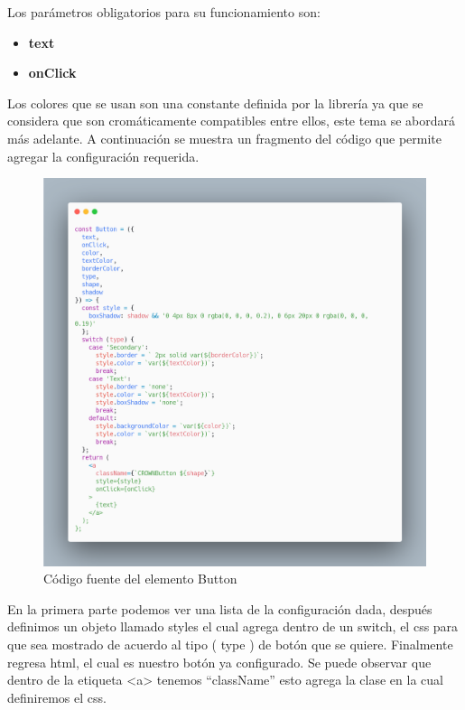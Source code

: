 Los parámetros obligatorios para su funcionamiento son:
\begin{itemize}
\item \textbf{text} 
\item \textbf{onClick} 
\end{itemize}
\newline
Los colores que se usan son una constante definida por la librería ya que se considera que son cromáticamente compatibles entre ellos, este tema se abordará más adelante.
A continuación se muestra un fragmento del código que permite agregar la configuración requerida.
\newline
\newline
\begin{figure}[H]
    \includegraphics[width=1\textwidth]{./Imagenes/carbon-9.png}
    \caption[Código fuente del elemento Button]{Código fuente del elemento Button}
    \end{figure}
\newline
\newline
En la primera parte podemos ver una lista de la configuración dada,  después definimos un objeto llamado styles el cual agrega dentro de un switch, el css para que sea mostrado de acuerdo al tipo ( type ) de botón que se quiere. Finalmente regresa html, el cual es nuestro botón ya configurado.
Se puede observar que dentro de la etiqueta <a>  tenemos “className” esto agrega la clase en la cual definiremos el css.
